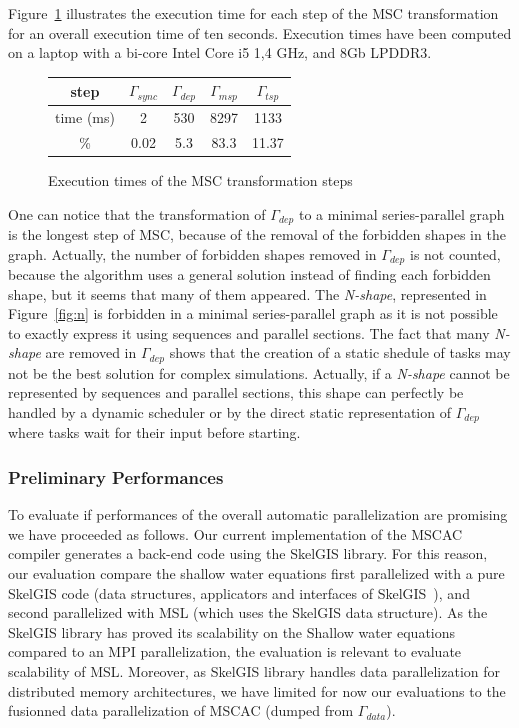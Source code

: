 Figure~\ref{fig:exectime} illustrates the execution time for each step of the MSC transformation for an overall execution time of ten seconds. Execution times have been computed on a laptop with a bi-core Intel Core i5 1,4 GHz, and 8Gb LPDDR3. 
\begin{figure}[!h]
 \begin{center}
 \begin{tabular}{c|c|c|c|c|}
   step & $\Gamma_{sync}$ & $\Gamma_{dep}$ & $\Gamma_{msp}$ & $\Gamma_{tsp}$\\
   \hline
   time (ms) & 2 & 530 & 8297 & 1133\\
   \hline
   \% & 0.02 & 5.3 & 83.3 & 11.37\\
 \end{tabular}
\caption{Execution times of the MSC transformation steps}
\label{fig:exectime}
 \end{center}
\end{figure}
One can notice that the transformation of $\Gamma_{dep}$ to a minimal series-parallel graph is the longest step of MSC, because of the removal of the forbidden shapes in the graph. Actually, the number of forbidden shapes removed in $\Gamma_{dep}$ is not counted, because the algorithm uses a general solution instead of finding each forbidden shape, but it seems that many of them appeared. The \emph{N-shape}, represented in Figure~\ref{fig:n} is forbidden in a minimal series-parallel graph as it is not possible to exactly express it using sequences and parallel sections.
The fact that many \emph{N-shape} are removed in $\Gamma_{dep}$ shows that the creation of a static shedule of tasks may not be the best solution for complex simulations. Actually, if a \emph{N-shape} cannot be represented by sequences and parallel sections, this shape can perfectly be handled by a dynamic scheduler or by the direct static representation of $\Gamma_{dep}$ where tasks wait for their input before starting.

\subsubsection*{Preliminary Performances}
To evaluate if performances of the overall automatic parallelization are promising we have proceeded as follows. Our current implementation of the MSCAC compiler generates a back-end code using the SkelGIS library. For this reason, our evaluation compare the shallow water equations first parallelized with a pure SkelGIS code (data structures, applicators and interfaces of SkelGIS~\cite{CPE:CPE3494}), and second parallelized with MSL (which uses the SkelGIS data structure). As the SkelGIS library has proved its scalability on the Shallow water equations compared to an MPI parallelization, the evaluation is relevant to evaluate scalability of MSL. 
Moreover, as SkelGIS library handles data parallelization for distributed memory architectures, we have limited for now our evaluations to the fusionned data parallelization of MSCAC (dumped from $\Gamma_{data}$). 


